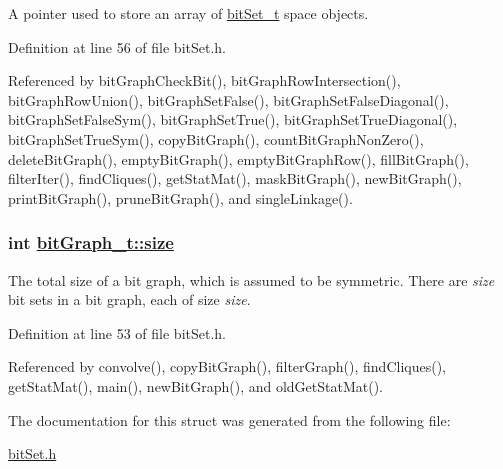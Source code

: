 A pointer used to store an array of \hyperlink{structbitSet__t}{bit\-Set\_\-t} space objects.

Definition at line 56 of file bit\-Set.h.

Referenced by bit\-Graph\-Check\-Bit(), bit\-Graph\-Row\-Intersection(), bit\-Graph\-Row\-Union(), bit\-Graph\-Set\-False(), bit\-Graph\-Set\-False\-Diagonal(), bit\-Graph\-Set\-False\-Sym(), bit\-Graph\-Set\-True(), bit\-Graph\-Set\-True\-Diagonal(), bit\-Graph\-Set\-True\-Sym(), copy\-Bit\-Graph(), count\-Bit\-Graph\-Non\-Zero(), delete\-Bit\-Graph(), empty\-Bit\-Graph(), empty\-Bit\-Graph\-Row(), fill\-Bit\-Graph(), filter\-Iter(), find\-Cliques(), get\-Stat\-Mat(), mask\-Bit\-Graph(), new\-Bit\-Graph(), print\-Bit\-Graph(), prune\-Bit\-Graph(), and single\-Linkage().\hypertarget{structbitGraph__t_o0}{
\subsubsection[size]{\setlength{\rightskip}{0pt plus 5cm}int \hyperlink{structbitGraph__t_o0}{bit\-Graph\_\-t::size}}}
\label{structbitGraph__t_o0}


The total size of a bit graph, which is assumed to be symmetric. There are {\em size\/} bit sets in a bit graph, each of size {\em size\/}.

Definition at line 53 of file bit\-Set.h.

Referenced by convolve(), copy\-Bit\-Graph(), filter\-Graph(), find\-Cliques(), get\-Stat\-Mat(), main(), new\-Bit\-Graph(), and old\-Get\-Stat\-Mat().

The documentation for this struct was generated from the following file:\begin{CompactItemize}
\item 
\hyperlink{bitSet_8h}{bit\-Set.h}\end{CompactItemize}
